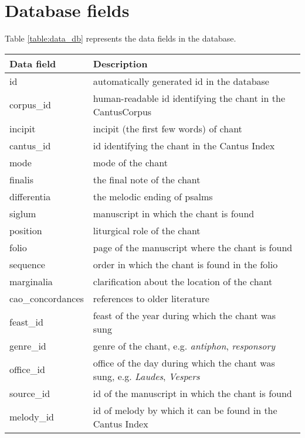 \section{Database fields}
\label{section:db_fields}

Table \ref{table:data_db} represents the data fields in the database.

\begin{longtable}{| p{} | p{} |}

 \hline
 Data field & Description \\
 \hline
 id             & automatically generated id in the database \\ \hline
 corpus\_id     & human-readable id identifying the chant in the CantusCorpus \\ \hline
 incipit        & incipit (the first few words) of chant \\ \hline
 cantus\_id     & id identifying the chant in the Cantus Index \\ \hline
 mode           & mode of the chant \\ \hline
 finalis        & the final note of the chant \\ \hline
 differentia    & the melodic ending of psalms \\ \hline
 siglum         & manuscript in which the chant is found \\ \hline
 position       & liturgical role of the chant \\ \hline
 folio          & page of the manuscript where the chant is found \\ \hline
 sequence       & order in which the chant is found in the folio \\ \hline
 marginalia     & clarification about the location of the chant \\ \hline
 cao\_concordances & references to older literature \\ \hline
 feast\_id      & feast of the year during which the chant was sung \\ \hline
 genre\_id      & genre of the chant, e.g. \emph{antiphon}, \emph{responsory} \\ \hline
 office\_id     & office of the day during which the chant was sung, e.g. \emph{Laudes}, \emph{Vespers} \\ \hline
 source\_id     & id of the manuscript in which the chant is found \\ \hline
 melody\_id     & id of melody by which it can be found in the Cantus Index \\ \hline

\end{longtable}
